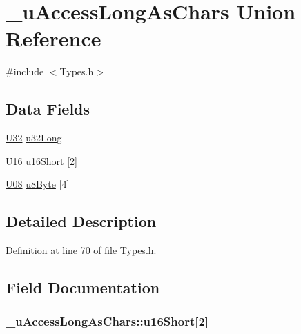 \hypertarget{union__u_access_long_as_chars}{}\section{\+\_\+u\+Access\+Long\+As\+Chars Union Reference}
\label{union__u_access_long_as_chars}


{\ttfamily \#include $<$Types.\+h$>$}

\subsection*{Data Fields}
\begin{DoxyCompactItemize}
\item 
\hyperlink{_types_8h_a811024d35b9b8a41095b1f583b649e56}{U32} \hyperlink{union__u_access_long_as_chars_a19e4d300562996e12ee1de6bea3afe59}{u32\+Long}
\item 
\hyperlink{_types_8h_adf928e51a60dba0df29d615401cc55a8}{U16} \hyperlink{union__u_access_long_as_chars_aa4787208bc0b2a5d747d334c56ad4dd6}{u16\+Short} \mbox{[}2\mbox{]}
\item 
\hyperlink{_types_8h_a3fd534ebc238a0e487b81bda78811de6}{U08} \hyperlink{union__u_access_long_as_chars_a7c798b474ed7a43a1d51624845e9a192}{u8\+Byte} \mbox{[}4\mbox{]}
\end{DoxyCompactItemize}


\subsection{Detailed Description}


Definition at line 70 of file Types.\+h.



\subsection{Field Documentation}
\subsubsection[{\texorpdfstring{u16\+Short}{u16Short}}]{ \+\_\+u\+Access\+Long\+As\+Chars\+::u16\+Short\mbox{[}2\mbox{]}}\hypertarget{union__u_access_long_as_chars_aa4787208bc0b2a5d747d334c56ad4dd6}{}\label{union__u_access_long_as_chars_aa4787208bc0b2a5d747d334c56ad4dd6}


